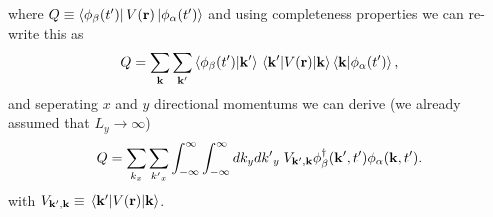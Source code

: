 where $Q \equiv \bra{\phi_{\beta}(t')}
V(\vb{r}) \ket{\phi_{\alpha}(t')}$ and using completeness properties we can re-write this as
\begin{equation} \label{eq_c18}
    Q =
    \sum_{\vb{k}}\sum_{\vb{k'}}
    \braket{\phi_{\beta}(t')}{\vb{k'}}
    \mel{\vb{k'}}{V(\vb{r})}{\vb{k}}
    \braket{\vb{k}}{\phi_{\alpha}(t')},
\end{equation}
and seperating $x$ and $y$ directional momentums we can derive (we already assumed that $L_y \rightarrow \infty$)
\begin{equation} \label{eq_c19}
    Q =
    \sum_{k_x}\sum_{{k'}_x}
    \int_{-\infty}^{\infty} \int_{-\infty}^{\infty} dk_y d{k'}_y \;
    V_{\vb{k'},\vb{k}}
    \phi_{\beta}^{\dagger}(\vb{k'},t')
    \phi_{\alpha}(\vb{k},t').
\end{equation}
with $V_{\vb{k'},\vb{k}} \equiv \mel{\vb{k'}}{V(\vb{r})}{\vb{k}}$.

